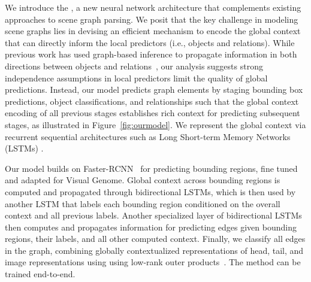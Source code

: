 We introduce the \term{\modellong~(\model)}, a new neural network architecture
that complements existing approaches to scene graph parsing.
We posit that the key challenge in modeling scene graphs lies in devising an efficient mechanism to encode the global context that can directly inform the local predictors (i.e., objects and relations).
While previous work has used graph-based inference to propagate information in both directions between objects and relations~\cite{xu_scene_2017, li2017msdn, li_vip-cnn:_2017}, our analysis suggests strong independence assumptions in local predictors limit the quality of global predictions. Instead, our model predicts graph elements by staging bounding box predictions, object classifications, and relationships such that the global context encoding of all previous stages establishes rich context for predicting subsequent stages, as illustrated in Figure~\ref{fig:ourmodel}.
We represent the global context via recurrent sequential architectures such as Long Short-term Memory Networks (LSTMs) \cite{Hochreiter:1997:LSM:1246443.1246450}.

Our model builds on Faster-RCNN~\cite{ren_faster_2015}  for predicting bounding regions, fine tuned and adapted for Visual Genome.
Global context across bounding regions is computed and propagated through bidirectional LSTMs, which is then used by another LSTM that labels each bounding region conditioned on the overall context and all previous labels.
Another specialized layer of bidirectional LSTMs then computes and propagates information for predicting edges given bounding regions, their labels, and all other computed context.
Finally, we classify all  edges in the graph, combining globally contextualized representations of head, tail, and image representations using using low-rank outer products~\cite{Kim2016HadamardPF}.
The method can be trained end-to-end.











